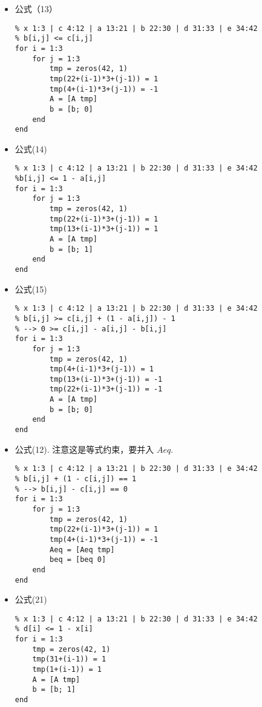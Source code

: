 \documentclass[onecolumn,times]{article}
\begin{document}
\begin{CJK}{UTF8}{gkai}
\begin{itemize}
\item 公式（13）
\begin{Verbatim}
% x 1:3 | c 4:12 | a 13:21 | b 22:30 | d 31:33 | e 34:42
% b[i,j] <= c[i,j]
for i = 1:3
	for j = 1:3
		tmp = zeros(42, 1)
		tmp(22+(i-1)*3+(j-1)) = 1
		tmp(4+(i-1)*3+(j-1)) = -1
		A = [A tmp]
		b = [b; 0]
	end
end
\end{Verbatim}

\item 公式(14)
\begin{Verbatim}
% x 1:3 | c 4:12 | a 13:21 | b 22:30 | d 31:33 | e 34:42
%b[i,j] <= 1 - a[i,j]
for i = 1:3
	for j = 1:3
		tmp = zeros(42, 1)
		tmp(22+(i-1)*3+(j-1)) = 1
		tmp(13+(i-1)*3+(j-1)) = 1
		A = [A tmp]
		b = [b; 1]
	end
end
\end{Verbatim}

\item 公式(15)
\begin{Verbatim}
% x 1:3 | c 4:12 | a 13:21 | b 22:30 | d 31:33 | e 34:42
% b[i,j] >= c[i,j] + (1 - a[i,j]) - 1
% --> 0 >= c[i,j] - a[i,j] - b[i,j]
for i = 1:3
	for j = 1:3
		tmp = zeros(42, 1)
		tmp(4+(i-1)*3+(j-1)) = 1
		tmp(13+(i-1)*3+(j-1)) = -1
		tmp(22+(i-1)*3+(j-1)) = -1
		A = [A tmp]
		b = [b; 0]
	end
end
\end{Verbatim}

\item 公式(12). 注意这是等式约束，要并入 $Aeq$.
\begin{Verbatim}
% x 1:3 | c 4:12 | a 13:21 | b 22:30 | d 31:33 | e 34:42
% b[i,j] + (1 - c[i,j]) == 1
% --> b[i,j] - c[i,j] == 0
for i = 1:3
	for j = 1:3
		tmp = zeros(42, 1)
		tmp(22+(i-1)*3+(j-1)) = 1
		tmp(4+(i-1)*3+(j-1)) = -1
		Aeq = [Aeq tmp]
		beq = [beq 0]
	end
end
\end{Verbatim}

\item 公式(21)
\begin{Verbatim}
% x 1:3 | c 4:12 | a 13:21 | b 22:30 | d 31:33 | e 34:42
% d[i] <= 1 - x[i]
for i = 1:3
	tmp = zeros(42, 1)
	tmp(31+(i-1)) = 1
	tmp(1+(i-1)) = 1
	A = [A tmp]
	b = [b; 1]
end
\end{Verbatim}


\end{itemize}
\end{CJK}
\end{document}
